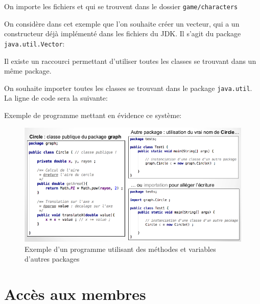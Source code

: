 		\begin{exemple} On importe les fichiers  et  qui se trouvent dans le dossier \lstinline|game/characters|
			
		\end{exemple}
	
		\begin{exemple} On considère dans cet exemple que l'on souhaite créer un vecteur, qui a un constructeur déjà implémenté dans les fichiers du JDK. Il s'agit du package \lstinline|java.util.Vector|:
			
		\end{exemple}
	
		Il existe un \og raccourci\fg{} permettant d'utiliser toutes les classes se trouvant dans un même package.
		\begin{exemple}
			On souhaite importer toutes les classes se trouvant dans le package \lstinline|java.util|. La ligne de code sera la suivante:
			
		\end{exemple}
	
		
		Exemple de programme mettant en évidence ce système: 
		\begin{figure}[h]
			\centering
			\includegraphics[width=1.0\linewidth]{images/programmepackages}
			\caption[Utilisation méthodes et variables d'autres packages]{Exemple d'un programme utilisant des méthodes et variables d'autres packages}
			\label{fig:programmepackages}
		\end{figure}
		
	
	\section{Accès aux membres}
	
